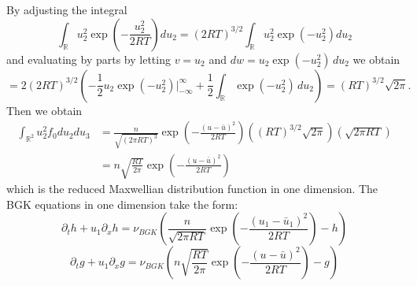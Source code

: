 %
By adjusting the integral
%
\begin{equation}
\int_{\mathbb{R}} u_2^2  \exp{\left(-\frac{u_2^2}{2 RT}\right)} du_2 = (2 R T)^{3/2} \int_{\mathbb{R}} u_2^2  \exp{\left(-u_2^2\right)} du_2
\end{equation}
%
and evaluating by parts by letting $v = u_2$ and $d w = u_2  \exp{\left(-u_2^2\right)} \, du_2$ we obtain
%
\begin{equation}
= 2 (2 R T)^{3/2} \left(-\frac{1}{2} u_2  \exp{\left(-u_2^2\right)}|_{-\infty}^\infty + \frac{1}{2} \int_{\mathbb{R}}  \exp{\left(-u_2^2\right)} \, du_2 \right) = (R T)^{3/2} \sqrt{2 \pi}.
\end{equation}
%
Then we obtain
%
\begin{align*}
\int_{\mathbb{R}^2} u_2^2 f_0 du_2 du_3 &= \frac{n}{\sqrt{(2 \pi RT)^3}}  \exp{\left(-\frac{(u - \bar{u})^2}{2 RT}\right)} \left((R T)^{3/2} \sqrt{2 \pi} \right) \left( \sqrt{2 \pi R T} \right) \\
&= n \sqrt{\frac{R T}{2 \pi}}  \exp{\left(-\frac{(u - \bar{u})^2}{2 RT}\right)}
\end{align*}
%
which is the reduced Maxwellian distribution function in one dimension. The BGK equations in one dimension take the form:
%
\begin{equation*}
\partial_t h + u_1 \partial_x h = \nu_{BGK} \left(\frac{n}{\sqrt{2 \pi RT}}  \exp{\left(-\frac{(u_1 - \bar{u}_1)^2}{2 RT}\right)} - h \right)
\end{equation*}
%
\begin{equation*}
\partial_t g + u_1 \partial_x g = \nu_{BGK} \left( n \sqrt{\frac{R T}{2 \pi}}  \exp{\left(-\frac{(u - \bar{u})^2}{2 RT}\right)} - g \right)
\end{equation*}

